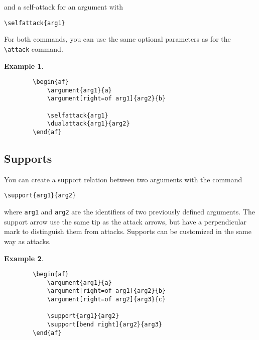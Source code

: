 \documentclass{article}
\newtheorem{example}{Example}
\begin{document}
    \noindent
    and a self-attack for an argument with

    \verb|\selfattack{arg1}|

    \noindent
    For both commands, you can use the same optional parameters as for the \verb|\attack| command.

    \begin{example}~
    \begin{verbatim}
        \begin{af}
            \argument{arg1}{a}
            \argument[right=of arg1]{arg2}{b}
    
            \selfattack{arg1}
            \dualattack{arg1}{arg2}
        \end{af}    
    \end{verbatim}

    \begin{center}
        \begin{af}
    
        \end{af}
    \end{center}
    \end{example}
    

\subsection{Supports}
    You can create a support relation between two arguments with the command

    \verb|\support{arg1}{arg2}|

    \noindent
    where \verb|arg1| and \verb|arg2| are the identifiers of two previously defined arguments.
    The support arrow use the same tip as the attack arrows, but have a perpendicular mark to distinguish them from attacks.
    Supports can be customized in the same way as attacks.

    \begin{example}~
    \begin{verbatim}
        \begin{af}
            \argument{arg1}{a}
            \argument[right=of arg1]{arg2}{b}
            \argument[right=of arg2]{arg3}{c}
    
            \support{arg1}{arg2}
            \support[bend right]{arg2}{arg3}
        \end{af}    
    \end{verbatim}

    \begin{center}
        \begin{af}
    
        \end{af}    
    \end{center}
    \end{example}
\end{document}
